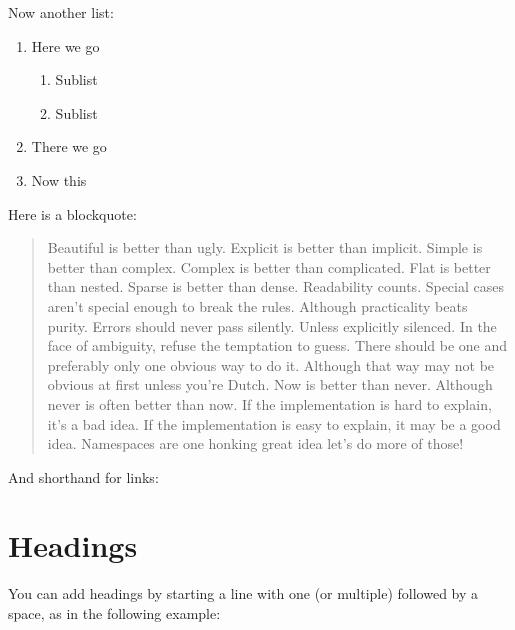 \documentclass[letterpaper,10pt,english]{sphinxmanual}
\begin{document}
\sphinxAtStartPar
Now another list:
\begin{enumerate}
%
\item {} 
\sphinxAtStartPar
Here we go
\begin{enumerate}
%
\item {} 
\sphinxAtStartPar
Sublist

\item {} 
\sphinxAtStartPar
Sublist

\end{enumerate}

\item {} 
\sphinxAtStartPar
There we go

\item {} 
\sphinxAtStartPar
Now this

\end{enumerate}

\sphinxAtStartPar
Here is a blockquote:
\begin{quote}

\sphinxAtStartPar
Beautiful is better than ugly. Explicit is better than implicit. Simple is better than complex. Complex is better than complicated. Flat is better than nested. Sparse is better than dense. Readability counts. Special cases aren’t special enough to break the rules. Although practicality beats purity. Errors should never pass silently. Unless explicitly silenced. In the face of ambiguity, refuse the temptation to guess. There should be one\textendash{} and preferably only one \textendash{}obvious way to do it.
Although that way may not be obvious at first unless you’re Dutch. Now is better than never. Although never is often better than  now. If the implementation is hard to explain, it’s a bad idea. If the implementation is easy to explain, it may be a good idea. Namespaces are one honking great idea \textendash{} let’s do more of those!
\end{quote}

\sphinxAtStartPar
And shorthand for links:

\sphinxAtStartPar
{}


\section{Headings}
\label{\detokenize{notebooks/Intro/EditCells:Headings}}
\sphinxAtStartPar
You can add headings by starting a line with one (or multiple) \sphinxcode{\sphinxupquote{\#}} followed by a space, as in the following example:
\end{document}
